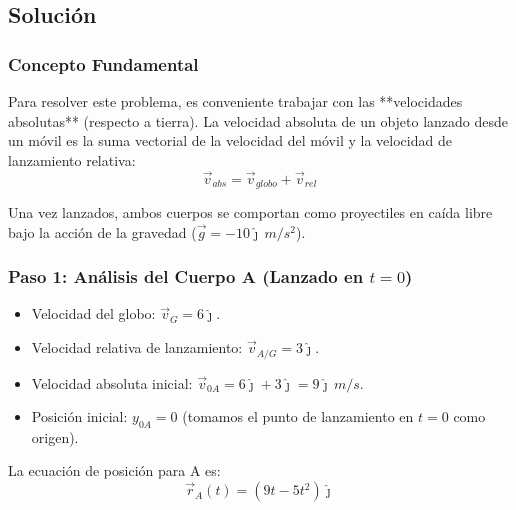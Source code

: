 \documentclass[12pt, a4paper]{article}
\begin{document}
\begin{center}
\end{center}

\subsection*{Solución}

\subsubsection*{Concepto Fundamental}
Para resolver este problema, es conveniente trabajar con las **velocidades absolutas** (respecto a tierra). La velocidad absoluta de un objeto lanzado desde un móvil es la suma vectorial de la velocidad del móvil y la velocidad de lanzamiento relativa:
\begin{equation}
    \vec{v}_{abs} = \vec{v}_{globo} + \vec{v}_{rel}
\end{equation}

Una vez lanzados, ambos cuerpos se comportan como proyectiles en caída libre bajo la acción de la gravedad ($\vec{g} = -10\hat{\jmath} \, \si{m/s^2}$).

\subsubsection*{Paso 1: Análisis del Cuerpo A (Lanzado en $t=0$)}
\begin{itemize}
    \item Velocidad del globo: $\vec{v}_G = 6\hat{\jmath}$.
    \item Velocidad relativa de lanzamiento: $\vec{v}_{A/G} = 3\hat{\jmath}$.
    \item Velocidad absoluta inicial: $\vec{v}_{0A} = 6\hat{\jmath} + 3\hat{\jmath} = 9\hat{\jmath} \, \si{m/s}$.
    \item Posición inicial: $y_{0A} = 0$ (tomamos el punto de lanzamiento en $t=0$ como origen).
\end{itemize}
La ecuación de posición para A es:
$$ \vec{r}_A(t) = (9t - 5t^2)\hat{\jmath} $$
\end{document}
